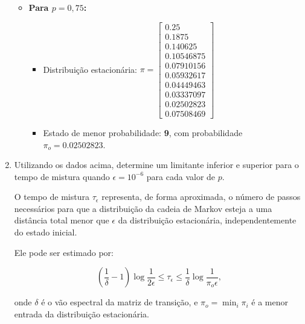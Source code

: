 \begin{enumerate}
\begin{resposta}
\begin{itemize}
            \newpage
            \item \textbf{Para $p = 0{,}75$:}
            \begin{itemize}
                \item Distribuição estacionária:
                $
                \pi = 
                \begin{bmatrix}
                0.25 \\
                0.1875 \\
                0.140625 \\
                0.10546875 \\
                0.07910156 \\
                0.05932617 \\
                0.04449463 \\
                0.03337097 \\
                \boxed{0.02502823} \\
                0.07508469
                \end{bmatrix}
                $
                \item Estado de menor probabilidade: \textbf{9}, com probabilidade $\boxed{\pi_o = 0.02502823}$.
            \end{itemize}
        \end{itemize}

    \end{resposta}

    \newpage
    \item Utilizando os dados acima, determine um limitante inferior e superior para o tempo de mistura quando $\epsilon = 10^{-6}$ para cada valor de $p$.
    \begin{resposta}
        O tempo de mistura $\tau_\epsilon$ representa, de forma aproximada, o número de passos necessários para que a distribuição da cadeia de Markov esteja a uma distância total menor que $\epsilon$ da distribuição estacionária, independentemente do estado inicial.
        
        Ele pode ser estimado por:
        
        $$ \left( \frac{1}{\delta} - 1 \right) \log \frac{1}{2\epsilon} \leq \tau_\epsilon \leq \frac{1}{\delta} \log \frac{1}{\pi_o \epsilon}, $$
        
        onde $\delta$ é o vão espectral da matriz de transição, e $\pi_o = \min_i \pi_i$ é a menor entrada da distribuição estacionária.
        

\end{resposta}
\end{enumerate}
